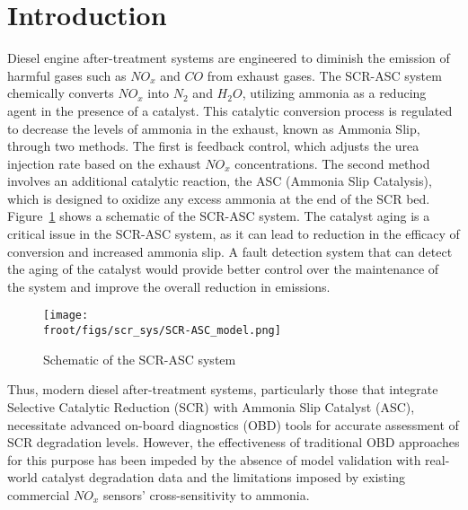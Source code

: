 \section{Introduction}

Diesel engine after-treatment systems are engineered to diminish the emission of harmful gases such as $NO_x$ and $CO$
from exhaust gases. The SCR-ASC system chemically converts $NO_x$ into $N_2$ and $H_2O$, utilizing ammonia as a reducing
agent in the presence of a catalyst. This catalytic conversion process is regulated to decrease the levels of ammonia in
the exhaust, known as Ammonia Slip, through two methods. The first is feedback control, which adjusts the urea injection
rate based on the exhaust $NO_x$ concentrations. The second method involves an additional catalytic reaction, the ASC
(Ammonia Slip Catalysis), which is designed to oxidize any excess ammonia at the end of the SCR bed.
Figure~\ref{fig:exhaust_scheme} shows a schematic of the SCR-ASC system. The catalyst aging is a critical issue in the
SCR-ASC system, as it can lead to reduction in the efficacy of conversion and increased ammonia slip. A fault detection
system that can detect the aging of the catalyst would provide better control over the maintenance of the system and
improve the overall reduction in emissions.

\begin{figure}[ht]
    \centering
    \texttt{[image: \\froot/figs/scr\_sys/SCR-ASC\_model.png]}
    \caption{Schematic of the SCR-ASC system}
    \label{fig:exhaust_scheme}
\end{figure}


Thus, modern diesel after-treatment systems, particularly those that integrate Selective Catalytic Reduction (SCR) with
Ammonia Slip Catalyst (ASC), necessitate advanced on-board diagnostics (OBD) tools for accurate assessment of SCR
degradation levels. However, the effectiveness of traditional OBD approaches for this purpose has been impeded by the
absence of model validation with real-world catalyst degradation data and the limitations imposed by existing commercial
$NO_x$ sensors' cross-sensitivity to ammonia.

